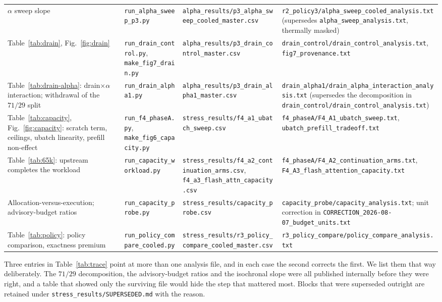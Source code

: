 \documentclass[manuscript,anonymous,review]{acmart}
\begin{document}
\begin{table}[t]
\begin{tabular}{@{}p{}p{}p{}p{}@{}}
    \midrule
    $\alpha$ sweep slope
      & \texttt{run\_alpha\_sweep\_p3.py}
      & \texttt{alpha\_results/p3\_alpha\_sweep\_cooled\_master.csv}
      & \texttt{r2\_policy3/alpha\_sweep\_cooled\_analysis.txt}
        (supersedes \texttt{alpha\_sweep\_analysis.txt}, thermally
        masked) \\
    Table~\ref{tab:drain}, Fig.~\ref{fig:drain}
      & \texttt{run\_drain\_control.py}, \texttt{make\_fig7\_drain.py}
      & \texttt{alpha\_results/p3\_drain\_control\_master.csv}
      & \texttt{drain\_control/drain\_control\_analysis.txt},
        \texttt{fig7\_provenance.txt} \\
    Table~\ref{tab:drain-alpha}: drain$\times\alpha$ interaction;
      withdrawal of the $71/29$ split
      & \texttt{run\_drain\_alpha1.py}
      & \texttt{alpha\_results/p3\_drain\_alpha1\_master.csv}
      & \texttt{drain\_alpha1/drain\_alpha\_interaction\_analysis.txt}
        (supersedes the decomposition in
        \texttt{drain\_control/drain\_control\_analysis.txt}) \\
    \midrule
    Table~\ref{tab:capacity}, Fig.~\ref{fig:capacity}: scratch term,
      ceilings, ubatch linearity, prefill non-effect
      & \texttt{run\_f4\_phaseA.py}, \texttt{make\_fig6\_capacity.py}
      & \texttt{stress\_results/f4\_a1\_ubatch\_sweep.csv}
      & \texttt{f4\_phaseA/F4\_A1\_ubatch\_sweep.txt},
        \texttt{ubatch\_prefill\_tradeoff.txt} \\
    Table~\ref{tab:65k}: upstream completes the workload
      & \texttt{run\_capacity\_workload.py}
      & \texttt{stress\_results/f4\_a2\_continuation\_arms.csv},
        \texttt{f4\_a3\_flash\_attn\_capacity.csv}
      & \texttt{f4\_phaseA/F4\_A2\_continuation\_arms.txt},
        \texttt{F4\_A3\_flash\_attention\_capacity.txt} \\
    Allocation-versus-execution; advisory-budget ratios
      & \texttt{run\_capacity\_probe.py}
      & \texttt{stress\_results/capacity\_probe.csv}
      & \texttt{capacity\_probe/capacity\_analysis.txt}; unit
        correction in \texttt{CORRECTION\_2026-08-07\_budget\_units.txt} \\
    \midrule
    Table~\ref{tab:policy}: policy comparison, exactness premium
      & \texttt{run\_policy\_compare\_cooled.py}
      & \texttt{stress\_results/r3\_policy\_compare\_cooled\_master.csv}
      & \texttt{r3\_policy\_compare/policy\_compare\_analysis.txt} \\
    \bottomrule
  \end{tabular}
\end{table}

Three entries in Table~\ref{tab:trace} point at more than one analysis
file, and in each case the second corrects the first. We list them that
way deliberately. The $71/29$ decomposition, the advisory-budget ratios
and the isochronal slope were all published internally before they were
right, and a table that showed only the surviving file would hide the
step that mattered most. Blocks that were superseded outright are
retained under \texttt{stress\_results/SUPERSEDED.md} with the reason.
\end{document}
